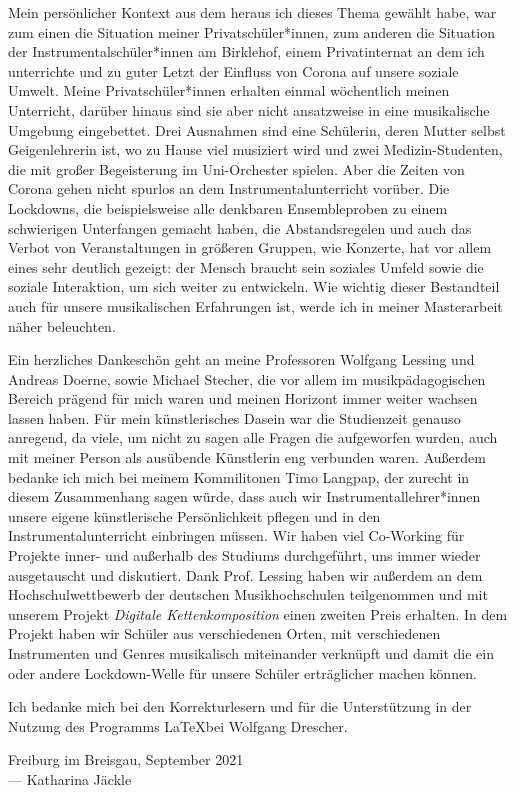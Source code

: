 
Mein persönlicher Kontext aus dem heraus ich dieses Thema gewählt habe, war
zum einen die Situation meiner Privatschüler*innen, zum anderen die Situation
der Instrumentalschüler*innen am Birklehof, einem Privatinternat an dem ich
unterrichte und zu guter Letzt der Einfluss von Corona auf unsere soziale
Umwelt. Meine Privatschüler*innen erhalten einmal wöchentlich meinen Unterricht,
darüber hinaus sind sie aber nicht ansatzweise in eine musikalische Umgebung
eingebettet. Drei Ausnahmen sind eine Schülerin, deren Mutter selbst
Geigenlehrerin ist, wo zu Hause viel musiziert wird und zwei
Medizin-Studenten, die mit großer Begeisterung im Uni-Orchester spielen. Aber
die Zeiten von Corona gehen nicht spurlos an dem Instrumentalunterricht vorüber.
Die Lockdowns, die beispielsweise alle denkbaren Ensembleproben zu einem
schwierigen Unterfangen gemacht haben, die Abstandsregelen und auch das Verbot
von Veranstaltungen in größeren Gruppen, wie Konzerte, hat vor allem eines sehr
deutlich gezeigt: der Mensch braucht sein soziales Umfeld sowie die soziale
Interaktion, um sich weiter zu entwickeln. Wie wichtig dieser Bestandteil auch
für unsere musikalischen Erfahrungen ist, werde ich in meiner Masterarbeit näher
beleuchten.

Ein herzliches Dankeschön geht an meine
Professoren Wolfgang Lessing und Andreas Doerne, sowie Michael Stecher, die
vor allem im musikpädagogischen Bereich prägend für mich waren und meinen
Horizont immer weiter wachsen lassen haben. Für mein künstlerisches Dasein war
die Studienzeit genauso anregend, da viele, um nicht zu sagen alle Fragen die
aufgeworfen wurden, auch mit meiner Person als ausübende Künstlerin eng
verbunden waren. Außerdem bedanke ich mich bei meinem Kommilitonen Timo Langpap,
der zurecht in diesem Zusammenhang sagen würde, dass auch wir
Instrumentallehrer*innen unsere eigene künstlerische Persönlichkeit pflegen und
in den Instrumentalunterricht einbringen müssen. Wir haben viel Co-Working für
Projekte inner- und außerhalb des Studiums durchgeführt, uns immer wieder
ausgetauscht und diskutiert. Dank Prof. Lessing haben wir außerdem an dem
Hochschulwettbewerb der deutschen Musikhochschulen teilgenommen und mit unserem
Projekt \emph{Digitale Kettenkomposition} einen zweiten Preis erhalten. In dem
Projekt haben wir Schüler aus verschiedenen Orten, mit verschiedenen
Instrumenten und Genres musikalisch miteinander verknüpft und damit die ein oder
andere Lockdown-Welle für unsere Schüler erträglicher machen können. 

Ich bedanke mich bei den Korrekturlesern und für die Unterstützung in der
Nutzung des Programms \LaTeX bei Wolfgang Drescher.




\vspace{0.5cm}

\begin{flushright}
	{
		\small
		Freiburg im Breisgau, September 2021\\
		--- Katharina Jäckle }
\end{flushright}
